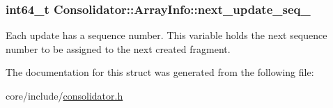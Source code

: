 \subsubsection[{next\+\_\+update\+\_\+seq\+\_\+}]{\setlength{\rightskip}{0pt plus 5cm}int64\+\_\+t Consolidator\+::\+Array\+Info\+::next\+\_\+update\+\_\+seq\+\_\+}\label{structConsolidator_1_1ArrayInfo_a3b947e8e8b2be5019cc6bf5bc60a1dfd}
Each update has a sequence number. This variable holds the next sequence number to be assigned to the next created fragment. 

The documentation for this struct was generated from the following file\+:\begin{DoxyCompactItemize}
\item 
core/include/\hyperlink{consolidator_8h}{consolidator.\+h}\end{DoxyCompactItemize}
